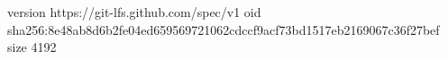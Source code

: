 version https://git-lfs.github.com/spec/v1
oid sha256:8e48ab8d6b2fe04ed659569721062cdccf9acf73bd1517eb2169067c36f27bef
size 4192
